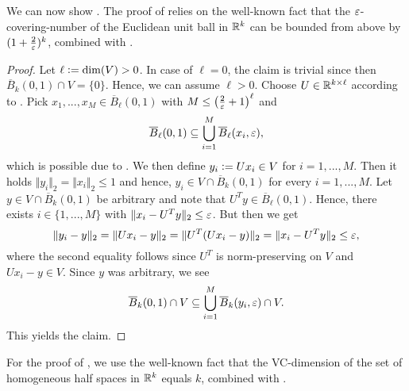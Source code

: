 We can now show . The proof of  relies on the well-known fact that the $\varepsilon$-covering-number of the Euclidean unit ball in $\mathbb{R}^k$ can be bounded from above by $(1 + \frac{2}{\varepsilon})^k$, combined with .
\renewcommand*{\proofname}{Proof of \Cref{prop:covering_ball}}
\begin{proof}
Let $\ell \mathrel{\mathop:}= \dim(V)>0$.
In case of $\ell = 0$, the claim is trivial since then $\overline{B}_k(0,1)\cap V = \{0\}$.
Hence, we can assume $\ell>0$. 
Choose $U \in \mathbb{R}^{k \times \ell}$ according to . 
Pick $x_1, ..., x_M \in \overline{B}_\ell(0,1)$ with $M \leq \left(\frac{2}{\varepsilon} + 1\right)^{\ell}$ and
\begin{equation*}
\overline{B}_\ell(0,1) \subseteq \bigcup_{i=1}^M \overline{B}_\ell (x_i, \varepsilon),
\end{equation*}
which is possible due to \cite[Corollary 4.2.13]{vershynin_high-dimensional_2018}. 
We then define $y_i \mathrel{\mathop:}= Ux_i \in V$ for $i=1,...,M$. 
Then it holds $\Vert y _i \Vert_2 = \Vert x_i \Vert_2 \leq 1$
and hence, $y_i \in V \cap \overline{B}_k(0,1)$ for every $i = 1,...,M$. 
Let $y \in V \cap \overline{B}_k(0,1)$ be arbitrary and note that $U^Ty \in \overline{B}_\ell(0,1)$.
Hence, there exists $i \in \{1,...,M\}$ with $\Vert x_i - U^Ty \Vert_2 \leq \varepsilon$. But then we get
\begin{equation*}
\Vert y_i - y \Vert_2 = \Vert Ux_i - y \Vert_2 = \Vert U^T (Ux_i - y)\Vert_2 = \Vert x_i - U^T y \Vert_2 \leq \varepsilon,
\end{equation*}
where the second equality follows since $U^T$ is norm-preserving on $V$ and $Ux_i - y \in V$. Since $y$ was arbitrary, we see
\begin{equation}\label{eq:U_final_cov}
\overline{B}_k(0,1) \cap V \subseteq \bigcup_{i=1}^M \overline{B}_k(y_i, \varepsilon) \cap V.
\end{equation}
This yields the claim. 
\end{proof}
For the proof of , 
we use the well-known fact that the VC-dimension of the set of homogeneous 
half spaces in $\mathbb{R}^k$ equals $k$, combined with .
\renewcommand*{\proofname}{Proof of \Cref{prop:vc_half_spaces_2}}
